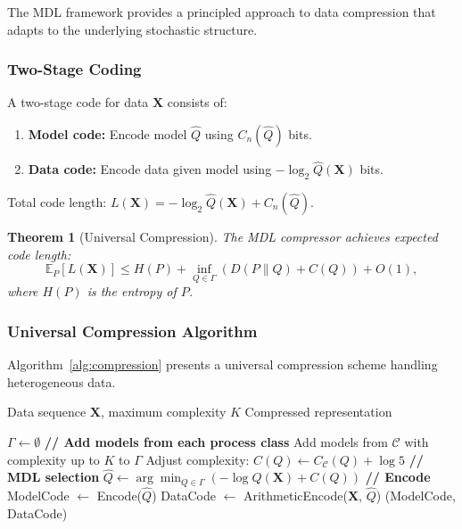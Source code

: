 \documentclass[preprint,review,12pt]{article}
\newtheorem{theorem}{Theorem}[section]
\begin{document}
The MDL framework provides a principled approach to data compression that 
adapts to the underlying stochastic structure.

\subsubsection{Two-Stage Coding}

A two-stage code for data $\mathbf{X}$ consists of:
\begin{enumerate}
\item \textbf{Model code:} Encode model $\hat{Q}$ using $C_n(\hat{Q})$ bits.
\item \textbf{Data code:} Encode data given model using 
$-\log_2 \hat{Q}(\mathbf{X})$ bits.
\end{enumerate}

Total code length: $L(\mathbf{X}) = -\log_2 \hat{Q}(\mathbf{X}) + C_n(\hat{Q})$.

\begin{theorem}[Universal Compression]\label{thm:compression}
The MDL compressor achieves expected code length:
\begin{equation}\label{eq:compression_bound}
	\mathbb{E}_P[L(\mathbf{X})] \leq H(P) + \inf_{Q \in \Gamma} \left( 
	D(P \| Q) + C(Q) \right) + O(1),
\end{equation}
where $H(P)$ is the entropy of $P$.
\end{theorem}

\subsubsection{Universal Compression Algorithm}

Algorithm~\ref{alg:compression} presents a universal compression scheme 
handling heterogeneous data.

\begin{algorithm}[t]
\caption{Universal MDL Compression}
\label{alg:compression}
\begin{algorithmic}[1]
	\REQUIRE Data sequence $\mathbf{X}$, maximum complexity $K$
	\ENSURE Compressed representation
	
	\STATE $\Gamma \leftarrow \emptyset$
	\STATE \textbf{// Add models from each process class}
	\STATE Add models from $\mathcal{C}$ with complexity up to $K$ to $\Gamma$
	\STATE Adjust complexity: $C(Q) \leftarrow C_{\mathcal{C}}(Q) + \log 5$
	\ENDFOR
	\STATE \textbf{// MDL selection}
	\STATE $\hat{Q} \leftarrow \arg\min_{Q \in \Gamma} (-\log Q(\mathbf{X}) + C(Q))$
	\STATE \textbf{// Encode}
	\STATE ModelCode $\leftarrow$ Encode($\hat{Q}$)
	\STATE DataCode $\leftarrow$ ArithmeticEncode($\mathbf{X}$, $\hat{Q}$)
	\RETURN (ModelCode, DataCode)
\end{algorithmic}
\end{algorithm}
\end{document}

